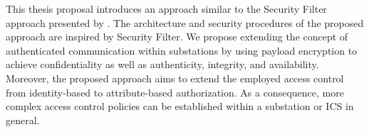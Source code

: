 This thesis proposal introduces an approach similar to the Security Filter approach presented by \citeauthor{Ishchenko2018}.
The architecture and security procedures of the proposed approach are inspired by Security Filter.
We propose extending the concept of authenticated communication within substations by using payload encryption to achieve confidentiality as well as authenticity, integrity, and availability.
Moreover, the proposed approach aims to extend the employed access control from identity-based to attribute-based authorization.
As a consequence, more complex access control policies can be established within a substation or ICS in general.

